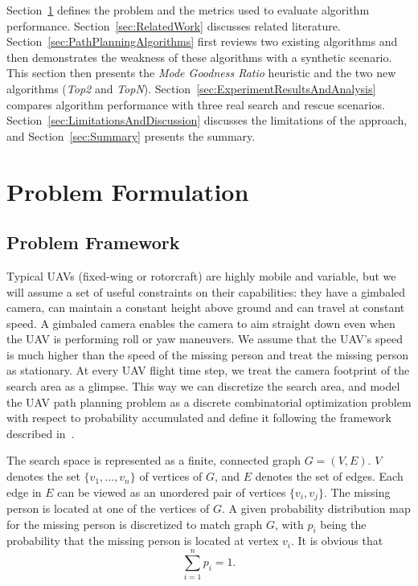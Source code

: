 Section~\ref{sec:ProblemFormulation} defines the problem and the metrics used to evaluate algorithm performance. Section~\ref{sec:RelatedWork} discusses related literature. Section~\ref{sec:PathPlanningAlgorithms} first reviews two existing algorithms and then demonstrates the weakness of these algorithms with a synthetic scenario. This section then presents the \textit{Mode Goodness Ratio} heuristic and the two new algorithms (\textit{Top2} and \textit{TopN}). Section~\ref{sec:ExperimentResultsAndAnalysis} compares algorithm performance with three real search and rescue scenarios. Section~\ref{sec:LimitationsAndDiscussion} discusses the limitations of the approach, and Section~\ref{sec:Summary} presents the summary.


\section{Problem Formulation}
\label{sec:ProblemFormulation}

\subsection{Problem Framework}

Typical UAVs (fixed-wing or rotorcraft) are highly mobile and variable, but we will assume a set of useful constraints on their capabilities: they have a gimbaled camera, can maintain a constant height above ground and can travel at constant speed. A gimbaled camera enables the camera to aim straight down even when the UAV is performing roll or yaw maneuvers. We assume that the UAV's speed is much higher than the speed of the missing person and treat the missing person as stationary. At every UAV flight time step, we treat the camera footprint of the search area as a glimpse. This way we can discretize the search area, and model the UAV path planning problem as a discrete combinatorial optimization problem with respect to probability accumulated and define it following the framework described in~\cite{Trummel1986Technical}.

The search space is represented as a finite, connected graph $G = (V, E)$. $V$ denotes the set $\{v_1, ..., v_n\}$ of vertices of $G$, and $E$ denotes the set of edges. Each edge in $E$ can be viewed as an unordered pair of vertices $\{v_i, v_j\}$. The missing person is located at one of the vertices of $G$. A given probability distribution map for the missing person is discretized to match graph $G$, with $p_i$ being the probability that the missing person is located at vertex $v_i$. It is obvious that
\begin{equation}
\sum_{i=1}^{n}p_i = 1.
\label{totalP}
\end{equation}

